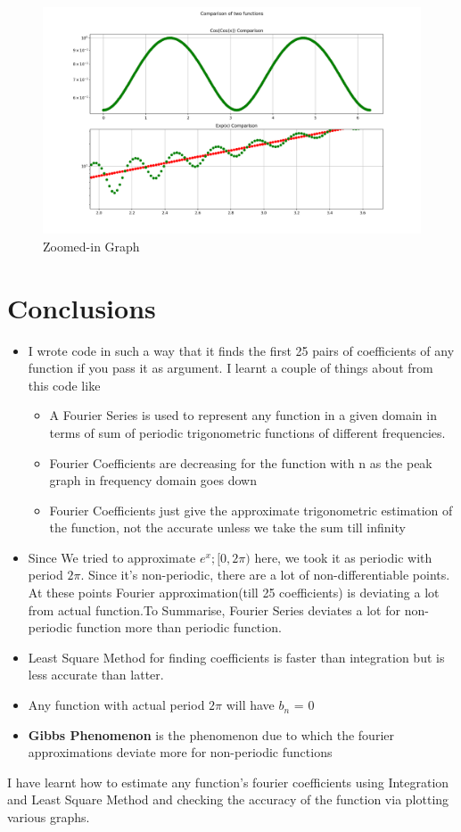 \documentclass[12pt, a4paper]{report}
\begin{document}
   \begin{figure}[!tbh]
   	\centering
   	\includegraphics[scale=0.5]{Q6b.png}
	\caption{Zoomed-in Graph}
   	\label{fig:sample}
   \end{figure}
   
\newpage
\section{Conclusions}
\begin{itemize}
   \item  I wrote code in such a way that it finds the first 25 pairs of coefficients of any function if you pass it as argument. I learnt a couple of things about from this code like 
   \begin{itemize}
   	\item A Fourier Series is used to represent any function in a given domain in terms of sum of periodic trigonometric functions of different frequencies.
	\item Fourier Coefficients are decreasing for the function with n as the peak graph in frequency domain goes down
	\item Fourier Coefficients just give the approximate trigonometric estimation of the function, not the accurate unless we take the sum till infinity
	\end{itemize}
 \item Since We tried to approximate $e^x ; [0, 2\pi) $ here, we took it as periodic with period $2\pi$. Since it's non-periodic, there are a lot of non-differentiable points. At these points Fourier approximation(till 25 coefficients) is deviating a lot from actual function.To Summarise, Fourier Series deviates a lot for non-periodic function more than periodic function.
 \item Least Square Method for finding coefficients is faster than integration but is less accurate than latter.
 \item Any function with actual period $2\pi$ will have $b_n$ = 0
 \item \textbf{Gibbs Phenomenon} is the phenomenon due to which the fourier approximations deviate more for non-periodic functions

\end{itemize}
I have learnt how to estimate any function's fourier coefficients using Integration and Least Square Method and checking the accuracy of the function via plotting various graphs.
\end{document}
